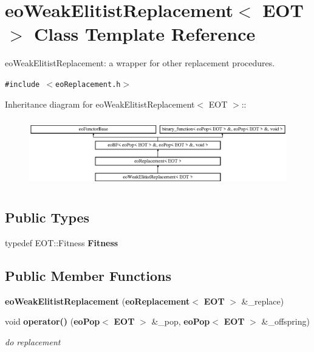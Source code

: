 \section{eo\-Weak\-Elitist\-Replacement$<$ EOT $>$ Class Template Reference}
\label{classeo_weak_elitist_replacement}
eo\-Weak\-Elitist\-Replacement: a wrapper for other replacement procedures.  


{\tt \#include $<$eo\-Replacement.h$>$}

Inheritance diagram for eo\-Weak\-Elitist\-Replacement$<$ EOT $>$::\begin{figure}[H]
\begin{center}
\leavevmode
\includegraphics[height=3.01075cm]{classeo_weak_elitist_replacement}
\end{center}
\end{figure}
\subsection*{Public Types}
\begin{CompactItemize}
\item 
typedef EOT::Fitness {\bf Fitness}\label{classeo_weak_elitist_replacement_w0}

\end{CompactItemize}
\subsection*{Public Member Functions}
\begin{CompactItemize}
\item 
{\bf eo\-Weak\-Elitist\-Replacement} ({\bf eo\-Replacement}$<$ {\bf EOT} $>$ \&\_\-replace)\label{classeo_weak_elitist_replacement_a0}

\item 
void {\bf operator()} ({\bf eo\-Pop}$<$ {\bf EOT} $>$ \&\_\-pop, {\bf eo\-Pop}$<$ {\bf EOT} $>$ \&\_\-offspring)\label{classeo_weak_elitist_replacement_a1}

\begin{CompactList}\small\item\em do replacement \item\end{CompactList}\end{CompactItemize}

